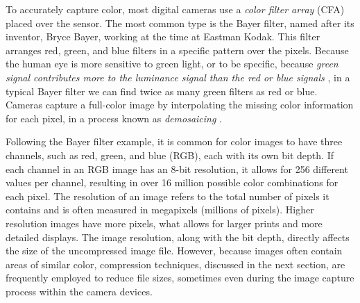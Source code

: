 


To accurately capture color, most digital cameras use a \emph{color filter array} (CFA) placed over the sensor. The most common type is the Bayer filter, named after its inventor, Bryce Bayer, working at the time at Eastman Kodak. This filter arranges red, green, and blue filters in a specific pattern over the pixels. Because the human eye is more sensitive to green light, or to be specific, because \emph{green signal contributes more to the luminance signal than the red or blue signals} \cite{hunt2005reproduction-colour}, in a typical Bayer filter we can find twice as many green filters as red or blue. Cameras capture a full-color image by interpolating the missing color information for each pixel, in a process known as \emph{demosaicing} \cite{aranda2020methodology}.



Following the Bayer filter example, it is common for color images to have three channels, such as red, green, and blue (RGB), each with its own bit depth. If each channel in an RGB image has an 8-bit resolution, it allows for 256 different values per channel, resulting in over 16 million possible color combinations for each pixel. The resolution of an image refers to the total number of pixels it contains and is often measured in megapixels (millions of pixels). Higher resolution images have more pixels, what allows for larger prints and more detailed displays. The image resolution, along with the bit depth, directly affects the size of the uncompressed image file. However, because images often contain areas of similar color, compression techniques, discussed in the next section, are frequently employed to reduce file sizes, sometimes even during the image capture process within the camera devices.


